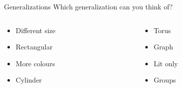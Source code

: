 \begin{frame}{Generalizations}
	Which generalization can you think of?
	
	\pause
	
	\begin{columns}[t]
		\begin{column}{0.45\textwidth}
			\begin{itemize}
				\item Different size
				\item Rectangular
				\item More colours
				\item Cylinder
			\end{itemize}
		\end{column}
		\begin{column}{0.45\textwidth}
			\begin{itemize}
				\item Torus
				\item Graph
				\item Lit only
				\item Groups
			\end{itemize}
		\end{column}
	\end{columns}
\end{frame}
